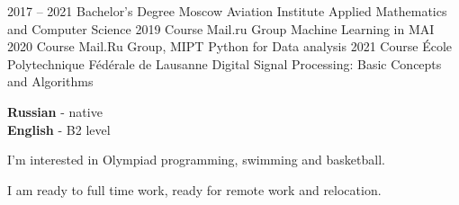 \documentclass[9pt]{developercv} %
\begin{document}
\vspace{0.05cm}



\begin{entrylist}
	\entry
		{2017 -- 2021}
		{Bachelor’s Degree}
		{Moscow Aviation Institute}
		{Applied Mathematics and Computer Science}
	\entry
		{2019}
		{Course}
		{Mail.ru Group}
		{Machine Learning in MAI}
	\entry
		{2020}
		{Course}
		{Mail.Ru Group, MIPT}
		{Python for Data analysis}
	\entry
		{2021}
		{Course}
		{École Polytechnique Fédérale de Lausanne}
		{Digital Signal Processing: Basic Concepts and Algorithms}
\end{entrylist}

\vspace{0.05cm}

\begin{minipage}[t]{0.2\textwidth}
	\vspace{-\baselineskip} %

	
	\textbf{Russian} - native\\
	\textbf{English} - B2 level\\

\end{minipage}
\hfill
\begin{minipage}[t]{0.40\textwidth}
	\vspace{-\baselineskip} %
	
	
	I'm interested in Olympiad programming, swimming and basketball.
\end{minipage}
\hfill
\begin{minipage}[t]{0.3\textwidth}
	\vspace{-\baselineskip} %
	
	
	I am ready to full time work, ready for remote work and relocation.
	
\end{minipage}

\end{document}
